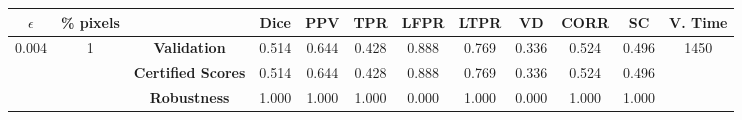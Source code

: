 \begin{longtable}{ c  c | c | c  c  c  c  c  c  c c c}
\toprule \textbf{$\epsilon$} & \textbf{\% pixels} & & \textbf{Dice} & \textbf{PPV} & \textbf{TPR} & \textbf{LFPR} & \textbf{LTPR} & \textbf{VD} & \textbf{CORR} & \textbf{SC} & \textbf{V. Time} \\
\midrule 
\multirow{3}{*}{0.004}  & \multirow{3}{*}{1} &\textbf{Validation} & 0.514 & 0.644 & 0.428 & 0.888 & 0.769 & 0.336 & 0.524 & 0.496 & \multirow{3}{*}{1450} \\
 & & \textbf{Certified Scores} & 0.514 & 0.644 & 0.428 & 0.888 & 0.769 & 0.336 & 0.524 & 0.496 & \\
& & \textbf{Robustness} & 1.000 & 1.000 & 1.000 & 0.000 & 1.000 & 0.000 & 1.000 & 1.000 & \\
\end{longtable}